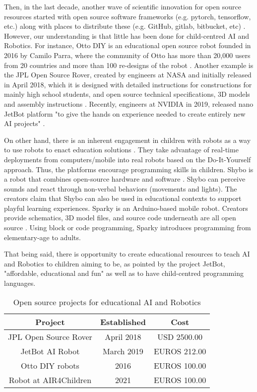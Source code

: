 \documentclass[sigconf]{acmart}
\begin{document}
Then, in the last decade, another wave of scientific innovation for open source resources started with open source software frameworks (e.g. pytorch, tensorflow, etc.) along with places to distribute these (e.g. GitHub, gitlab, bitbucket, etc) \cite{matelabs2017}.
However, our understanding is that little has been done for child-centred AI and Robotics. 
For instance, Otto DIY is an educational open source robot founded in 2016 by Camilo Parra, where the community of Otto has more than 20,000 users from 20 countries and more than 100 re-designs of the robot \cite{OttoDIY:2016}.
Another example is the JPL Open Source Rover, created by engineers at NASA and initially released in April 2018, which it is designed with detailed instructions for constructions for mainly high school students, and open source technical specifications, 3D models and assembly instructions \cite{OSR:2018}.
Recently, engineers at NVIDIA in 2019, released nano JetBot platform  "to give the hands on experience needed to create entirely new AI projects" \cite{nanoJetBot:2019}. 

On other hand, there is an inherent engagement in children with robots as a way to use robots to enact education solutions \cite{druga2019}. 
They take advantage of real-time deployments from computers/mobile into real robots based on the Do-It-Yourself approach. 
Thus, the platforms encourage programming skills in children. 
Shybo is a robot that combines open-source hardware and software \cite{Lupetti2017}.
Shybo can perceive sounds and react through non-verbal behaviors (movements and lights). 
The creators claim that Shybo can also be used in educational contexts to support playful learning experiences. 
Sparky is an Arduino-based mobile robot. Creators provide schematics, 3D model files, and source code underneath are all open source \cite{sparky2012}. 
Using block or code programming, Sparky introduces programming from elementary-age to adults.

That being said, there is opportunity to create educational resources to teach AI and Robotics to children aiming to be, as pointed by the project JetBot, "affordable, educational and fun" \cite{nanoJetBot:2019} as well as to have child-centred programming languages.



\begin{table}
  \begin{tabular}{ccc}
    \toprule
    Project & Established  & Cost\\
    \midrule
    JPL Open Source Rover \cite{OSR:2018} & April 2018  &  USD 2500.00 \\
    JetBot AI Robot \cite{nanoJetBot:2019} & March 2019  & EUROS 212.00    \\
    Otto DIY robots \cite{OttoDIY:2016} & 2016 &  EUROS 100.00  \\
    Robot at AIR4Children & 2021 & EUROS 100.00  \\
  \bottomrule
\end{tabular}
\caption{Open source projects for educational AI and Robotics}
\label{tab:opensourceprojects}
\end{table}
\end{document}
